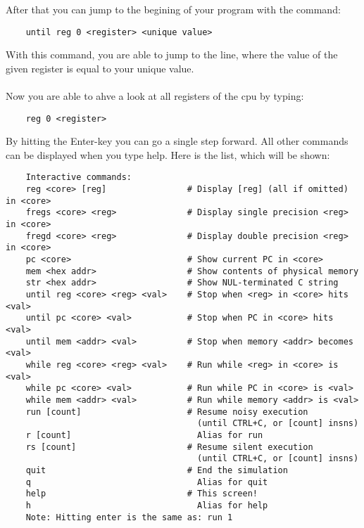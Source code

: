 \documentclass[a4paper, oneside]{scrreprt}
\begin{document}
After that you can jump to the begining of your program with the command:
\begin{verbatim}
    until reg 0 <register> <unique value>
\end{verbatim}
With this command, you are able to jump to the line, where the value of the given register is equal to your unique value.\\
\\
Now you are able to ahve a look at all registers of the cpu by typing:
\begin{verbatim}
    reg 0 <register>
\end{verbatim}
By hitting the Enter-key you can go a single step forward.
All other commands can be displayed when you type help. Here is the list, which will be shown:
\begin{verbatim}
    Interactive commands:
    reg <core> [reg]                # Display [reg] (all if omitted) in <core>
    fregs <core> <reg>              # Display single precision <reg> in <core>
    fregd <core> <reg>              # Display double precision <reg> in <core>
    pc <core>                       # Show current PC in <core>
    mem <hex addr>                  # Show contents of physical memory
    str <hex addr>                  # Show NUL-terminated C string
    until reg <core> <reg> <val>    # Stop when <reg> in <core> hits <val>
    until pc <core> <val>           # Stop when PC in <core> hits <val>
    until mem <addr> <val>          # Stop when memory <addr> becomes <val>
    while reg <core> <reg> <val>    # Run while <reg> in <core> is <val>
    while pc <core> <val>           # Run while PC in <core> is <val>
    while mem <addr> <val>          # Run while memory <addr> is <val>
    run [count]                     # Resume noisy execution 
                                      (until CTRL+C, or [count] insns)
    r [count]                         Alias for run
    rs [count]                      # Resume silent execution 
                                      (until CTRL+C, or [count] insns)
    quit                            # End the simulation
    q                                 Alias for quit
    help                            # This screen!
    h                                 Alias for help
    Note: Hitting enter is the same as: run 1
\end{verbatim}
\end{document}
